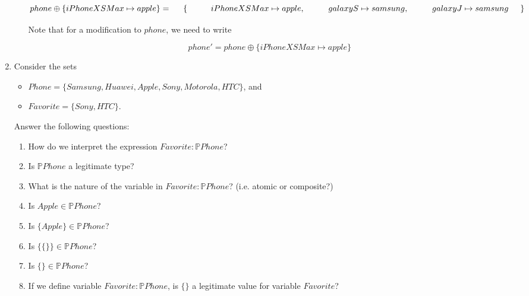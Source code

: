 \documentclass[12pt]{article}
\begin{document}
\begin{enumerate}
\begin{enumerate}
\[
phone \oplus \{ iPhoneXSMax \mapsto apple \} = \\
\hspace{5mm} \{\\
\hspace{10mm} iPhoneXSMax \mapsto apple, \\
\hspace{10mm} galaxyS \mapsto samsung, \\
\hspace{10mm} galaxyJ \mapsto samsung \\
\hspace{5mm} \}
\]

\noindent Note that for a modification to $phone$, we need to write

\[ phone' = phone \oplus \{ iPhoneXSMax \mapsto apple \} \]

\end{enumerate}



\item Consider the sets

\begin{itemize}
\item $Phone = \{ Samsung, Huawei, Apple, Sony, Motorola, HTC \}$, and
\item  $Favorite = \{ Sony, HTC \}$.
\end{itemize}

\noindent Answer the following questions:

\begin{enumerate}

\item How do we interpret the expression $Favorite : \mathbb{P} Phone$?

\item Is $\mathbb{P} Phone$ a legitimate type?

\item What is the nature of the variable in $Favorite : \mathbb{P} Phone$? (i.e. atomic or composite?)

\item Is $Apple \in \mathbb{P} Phone$?

\item Is $\{ Apple \} \in \mathbb{P} Phone$?

\item Is $\{ \{ \} \} \in \mathbb{P} Phone$?

\item Is $\{ \} \in \mathbb{P} Phone$?

\item If we define variable $Favorite : \mathbb{P} Phone$, is $\{ \}$ a legitimate value for variable $Favorite$?


\end{enumerate}
\end{enumerate}
\end{document}
